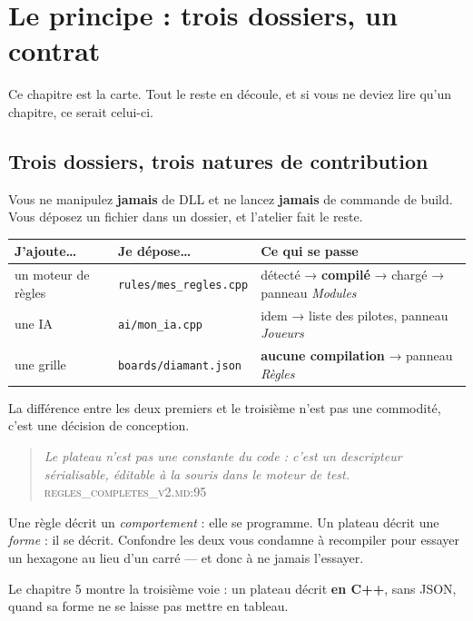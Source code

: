 \chapter{Le principe : trois dossiers, un contrat}

Ce chapitre est la carte. Tout le reste en découle, et si vous ne deviez lire
qu'un chapitre, ce serait celui-ci.

\section{Trois dossiers, trois natures de contribution}

Vous ne manipulez \textbf{jamais} de DLL et ne lancez \textbf{jamais} de commande
de build. Vous déposez un fichier dans un dossier, et l'atelier fait le reste.

\begin{center}
\begin{tabular}{@{}p{3.4cm}p{4.6cm}p{5.8cm}@{}}
\toprule
\textbf{J'ajoute\ldots} & \textbf{Je dépose\ldots} & \textbf{Ce qui se passe} \\
\midrule
un moteur de règles & \texttt{rules/mes\_regles.cpp} & détecté → \textbf{compilé} → chargé → panneau \emph{Modules} \\
une IA & \texttt{ai/mon\_ia.cpp} & idem → liste des pilotes, panneau \emph{Joueurs} \\
une grille & \texttt{boards/diamant.json} & \textbf{aucune compilation} → panneau \emph{Règles} \\
\bottomrule
\end{tabular}
\end{center}

La différence entre les deux premiers et le troisième n'est pas une commodité,
c'est une décision de conception.

\begin{nkretenir}
\begin{quote}
\emph{Le plateau n'est pas une constante du code : c'est un descripteur
sérialisable, éditable à la souris dans le moteur de test.}
\hfill\textsc{regles\_completes\_v2.md:95}
\end{quote}
Une règle décrit un \emph{comportement} : elle se programme. Un plateau décrit
une \emph{forme} : il se décrit. Confondre les deux vous condamne à recompiler
pour essayer un hexagone au lieu d'un carré — et donc à ne jamais l'essayer.

Le chapitre 5 montre la troisième voie : un plateau décrit \textbf{en C++}, sans
JSON, quand sa forme ne se laisse pas mettre en tableau.
\end{nkretenir}

